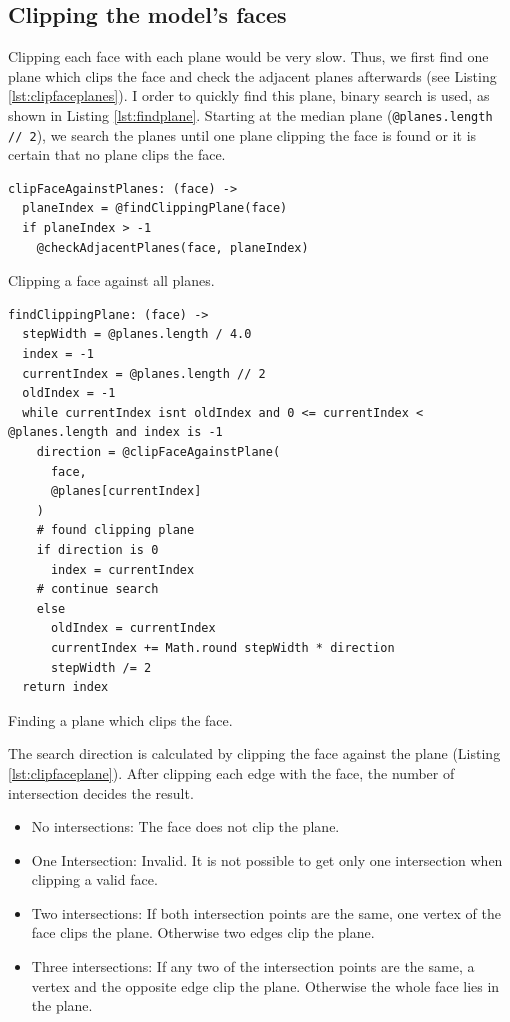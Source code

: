 \documentclass[../ClassicThesis.tex]{subfiles}
\begin{document}
\subsection{Clipping the model's faces}

Clipping each face with each plane would be very slow. Thus, we first find one plane which clips the face and check the adjacent planes afterwards (see Listing \ref{lst:clipfaceplanes}). I order to quickly find this plane, binary search is used, as shown in Listing \ref{lst:findplane}. Starting at the median plane (\texttt{@planes.length // 2}), we search the planes until one plane clipping the face is found or it is certain that no plane clips the face.

\begin{listing}
\begin{verbatim}
clipFaceAgainstPlanes: (face) ->
  planeIndex = @findClippingPlane(face)
  if planeIndex > -1
    @checkAdjacentPlanes(face, planeIndex)
\end{verbatim}
\caption{Clipping a face against all planes.}
\label{lst:clipfaceplanes}
\end{listing}

\begin{listing}
\begin{verbatim}
findClippingPlane: (face) ->
  stepWidth = @planes.length / 4.0
  index = -1
  currentIndex = @planes.length // 2
  oldIndex = -1
  while currentIndex isnt oldIndex and 0 <= currentIndex < @planes.length and index is -1
    direction = @clipFaceAgainstPlane(
      face, 
      @planes[currentIndex]
    )
    # found clipping plane
    if direction is 0
      index = currentIndex
    # continue search
    else
      oldIndex = currentIndex
      currentIndex += Math.round stepWidth * direction
      stepWidth /= 2
  return index
\end{verbatim}
\caption{Finding a plane which clips the face.}
\label{lst:findplane}
\end{listing}

The search direction is calculated by clipping the face against the plane (Listing \ref{lst:clipfaceplane}). After clipping each edge with the face, the number of intersection decides the result.

\begin{itemize}
  \item No intersections: The face does not clip the plane.
  \item One Intersection: Invalid. It is not possible to get only one intersection when clipping a valid face.
  \item Two intersections: If both intersection points are the same, one vertex of the face clips the plane. Otherwise two edges clip the plane.
  \item Three intersections: If any two of the intersection points are the same, a vertex and the opposite edge clip the plane. Otherwise the whole face lies in the plane.
\end{itemize}
\end{document}
